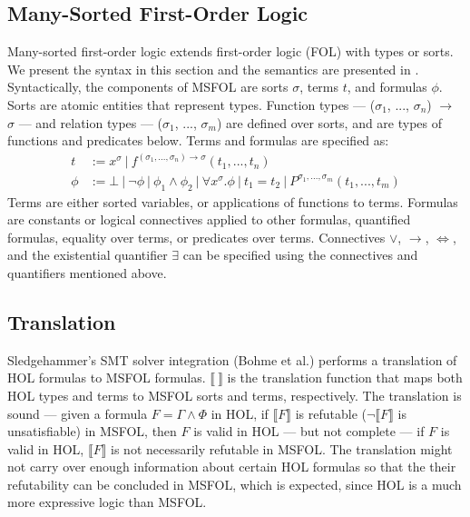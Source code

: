 \documentclass{article}
\begin{document}
	\subsection{Many-Sorted First-Order Logic}
	\label{sec:msfol}
	Many-sorted first-order logic extends
	first-order logic (FOL) with 
	types or sorts. We present the 
	syntax in this section and the 
	semantics are presented in
	\cite{Barrett2018}. Syntactically, 
	the components of MSFOL are sorts 
	$\sigma$, terms $t$, and 
	formulas $\phi$. Sorts are 
	atomic entities that 
	represent types. Function types 
	--- ($\sigma_1$, ..., $\sigma_n$) 
	$\to$ $\sigma$ ---
	and relation types 
	--- ($\sigma_1$, ..., $\sigma_m$)
	are defined over sorts, and 
	are types of functions and 
	predicates below. Terms and 
	formulas are specified as:
	\begin{align*}
	t &:= x^{\sigma}\ |\ 
	f^{(\sigma_1, ..., \sigma_n) \to 
		\sigma}	(t_1, ..., t_n)\\
	\phi &:= \bot\ |\ \neg \phi\ |\ 
	\phi_1 \land \phi_2\ |\ \forall 
	x^{\sigma} . \phi\ |\ t_1 = t_2
	\ |\ P^{\sigma_1,...,\sigma_m}
	(t_1, ..., t_m)
	\end{align*}
	Terms are either sorted variables, 
	or applications of functions to terms.
	Formulas are constants or logical 
	connectives applied to other 
	formulas, quantified formulas, 
	equality over terms, or predicates 
	over terms. Connectives $\lor$, 
	$\to$, $\iff$, and the existential
	quantifier $\exists$ can be 
	specified using the connectives 
	and quantifiers mentioned above.
	
	\subsection{Translation}
	\label{sec:trans}
	Sledgehammer's SMT solver 
	integration (Bohme et al.) performs 
	a translation 
	of HOL formulas to MSFOL formulas.
	$\llbracket\ \rrbracket$
	is the translation function 
	that maps both HOL types and 
	terms to MSFOL sorts and terms,
	respectively.
	The translation is sound --- 
	given a formula 
	$F = \Gamma \land \Phi$ in HOL, if 
	$\llbracket F \rrbracket$ is refutable 
	($\neg \llbracket F \rrbracket$
	is unsatisfiable) in MSFOL, then 
	$F$	is valid in HOL --- but not 
	complete --- if $F$ is valid in 
	HOL, $\llbracket F \rrbracket$ is 
	not necessarily refutable in MSFOL. 
	The translation might not carry over 
	enough information about certain HOL 
	formulas so that the their 
	refutability can be concluded in 
	MSFOL, which is	expected, since HOL 
	is a much more expressive logic than 
	MSFOL. 
	
\end{document}
